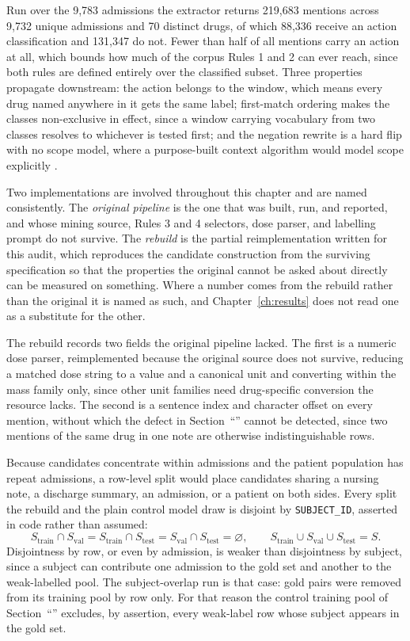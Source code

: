 Run over the 9,783 admissions the extractor returns 219,683 mentions across 9,732 unique admissions
and 70 distinct drugs, of which 88,336 receive an action classification and 131,347 do not. Fewer
than half of all mentions carry an action at all, which bounds how much of the corpus Rules 1 and 2
can ever reach, since both rules are defined entirely over the classified subset. Three properties
propagate downstream: the action belongs to the window, which means every
drug named anywhere in it gets the same label; first-match ordering makes the classes
non-exclusive in effect, since a window carrying vocabulary from two classes resolves to whichever is
tested first; and the negation rewrite is a hard flip with no scope model, where a purpose-built
context algorithm would model scope explicitly \citep{chapman2001negex}.

Two implementations are involved throughout this chapter and are named
consistently. The \emph{original pipeline} is the one that was built, run, and
reported, and whose mining source, Rules 3 and 4 selectors, dose parser, and
labelling prompt do not survive. The \emph{rebuild} is the partial
reimplementation written for this audit, which reproduces the candidate
construction from the surviving specification so that the properties the
original cannot be asked about directly can be measured on something. Where a
number comes from the rebuild rather than the original it is named as such, and
Chapter~\ref{ch:results} does not read one as a substitute for the other.

The rebuild records two fields the original pipeline lacked. The first is a numeric dose parser,
reimplemented because the original source does not survive, reducing a matched dose string to a
value and a canonical unit and converting within the mass family only, since other unit families
need drug-specific conversion the resource lacks. The second is a sentence index and character
offset on every mention, without which the defect in Section~``'' cannot be
detected, since two mentions of the same drug in one note are otherwise indistinguishable rows.

Because candidates concentrate within admissions and the patient population has repeat admissions, a
row-level split would place candidates sharing a nursing note, a discharge summary, an admission, or
a patient on both sides.  Every split the rebuild and the plain control model draw is disjoint by \texttt{SUBJECT\_ID}, asserted in code rather than assumed:
\[
S_{\text{train}} \cap S_{\text{val}} = S_{\text{train}} \cap S_{\text{test}}
= S_{\text{val}} \cap S_{\text{test}} = \varnothing ,
\qquad
S_{\text{train}} \cup S_{\text{val}} \cup S_{\text{test}} = S .
\]
 Disjointness by row, or even by admission, is weaker than disjointness by subject, since a subject can contribute one admission to the gold set and another to the weak-labelled pool. The subject-overlap run is that case: gold pairs were removed from its training pool by row only. For that reason the control
training pool of Section~``'' excludes, by assertion, every weak-label
row whose subject appears in the gold set.

